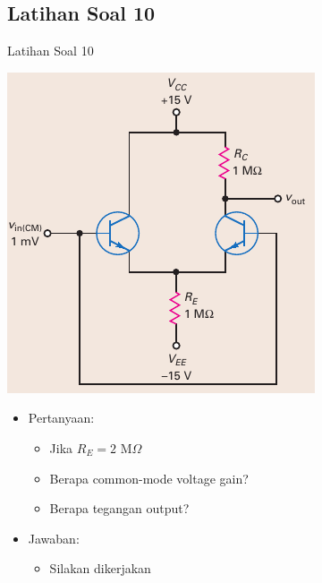 \documentclass[aspectratio=169]{beamer}
\begin{document}
\subsection{Latihan Soal 10}
\begin{frame}{Latihan Soal 10}
	\begin{multicols}{2}
		\begin{center}
			\includegraphics[height=0.7\textheight]{gambar/01.fig21}
		\end{center}
		\columnbreak
		\begin{itemize}
			\item Pertanyaan:
			\begin{itemize}
				\item Jika $ R_E = 2 \text{ M}\Omega $
				\item Berapa common-mode voltage gain?
				\item Berapa tegangan output?
			\end{itemize}
			\item Jawaban:
			\begin{itemize}
				\item Silakan dikerjakan
			\end{itemize}
		\end{itemize}
	\end{multicols}
\end{frame}
\end{document}
